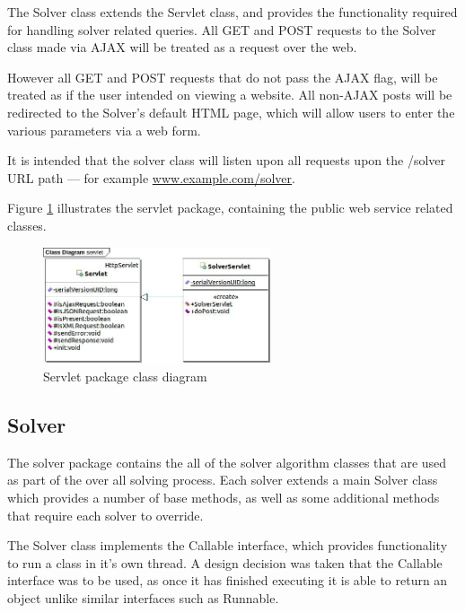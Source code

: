 The Solver class extends the Servlet class, and provides the functionality 
required for handling solver related queries. All GET and POST requests to the
Solver class made via AJAX will be treated as a request over the web. 

However all GET and POST requests that do not pass the AJAX flag, will be 
treated as if the user intended on viewing a website. All non-AJAX posts will be 
redirected to the Solver's default HTML page, which will allow users to enter 
the various parameters via a web form.

It is intended that the solver class will listen upon all requests upon the 
/solver URL path --- for example \href{}{www.example.com/solver}.

Figure \ref{fig:servlet_package} illustrates the servlet package, containing 
the public web service related classes.

\begin{figure}[H]
  \centering
  \includegraphics[width=0.6\textwidth]{design/class/servlet.jpg}
  \caption{Servlet package class diagram}
  \label{fig:servlet_package}
\end{figure}


\subsection{Solver}
\label{sub:solver}

The solver package contains the all of the solver algorithm classes that are 
used as part of the over all solving process. Each solver extends a main Solver
class which provides a number of base methods, as well as some additional 
methods that require each solver to override.

The Solver class implements the Callable interface, which provides functionality
to run a class in it's own thread. A design decision was taken that the Callable
interface was to be used, as once it has finished executing it is able to return
an object unlike similar interfaces such as Runnable.


